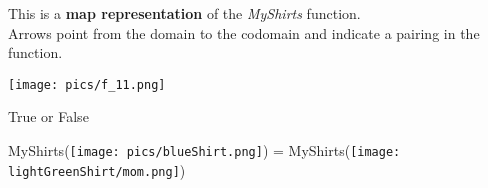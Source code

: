 \documentclass{ximera}
\author{Lee Wayand}
\begin{document}
\begin{exercise}





This is a \textbf{map representation} of the \textit{MyShirts} function. \\

Arrows point from the domain to the codomain and indicate a pairing in the function.

\begin{image}
\texttt{[image: pics/f\_11.png]}
\end{image}















\begin{question}

True or False

\begin{center}
\Huge{MyShirts(\texttt{[image: pics/blueShirt.png]}) = MyShirts(\texttt{[image: lightGreenShirt/mom.png]})}
\end{center}






\begin{multipleChoice}
\end{multipleChoice}

\end{question}



















\end{exercise}
\end{document}
